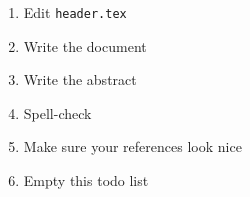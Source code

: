 \begin{enumerate}
\item Edit \verb+header.tex+
\item Write the document
\item Write the abstract
\item Spell-check
\item Make sure your references look nice
\item Empty this todo list
\end{enumerate}
